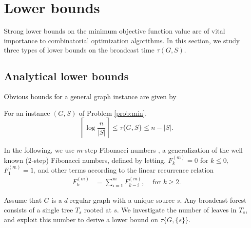 \section{Lower bounds} \label{sec:lb}
Strong lower bounds on the minimum objective function value are of vital importance to combinatorial optimization algorithms.
In this section, we study three types of lower bounds on the broadcast time $\tau(G,S)$.

\subsection{Analytical lower bounds} \label{sec:lbanalyt}
Obvious bounds for a general graph instance are given by
\begin{observation}
For an instance $(G,S)$ of Problem \ref{prob:min},
\begin{equation}
\left\lceil\log\frac{n}{|S|}\right\rceil\leq \tau\{G,S\} \leq n-|S|.
\label{eq:loglb}
\end{equation}
\label{obs:loglb}
\end{observation}

In the following, we use $m$-step Fibonacci numbers \cite{noe05}, a generalization of the well known (2-step) Fibonacci numbers, defined by letting, 
$F^{(m)}_k=0$ for $k\leq 0$, $F^{(m)}_1=1$, and 
other terms according to the linear recurrence relation 
\begin{align*}
F^{(m)}_k &=\sum\limits_{i=1}^m F^{(m)}_{k-i}, &\text{ for } k\geq 2.
\end{align*}

Assume that $G$ is a $d$-regular graph with a unique source $s$.
Any broadcast forest consists of a single tree $T_s$ rooted at $s$.
We investigate the number of leaves in $T_s$, and exploit this number to derive a lower bound on $\tau\{G,\{s\}\}$.

